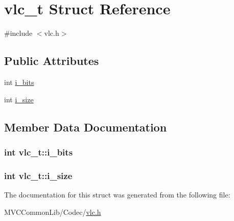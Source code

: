 \hypertarget{structvlc__t}{
\section{vlc\_\-t Struct Reference}
\label{structvlc__t}
}


{\ttfamily \#include $<$vlc.h$>$}

\subsection*{Public Attributes}
\begin{DoxyCompactItemize}
\item 
int \hyperlink{structvlc__t_af77d182a8c7102c14ec84be5b0f407c7}{i\_\-bits}
\item 
int \hyperlink{structvlc__t_a5f71a18991e1f971d2ffe3fd1272de77}{i\_\-size}
\end{DoxyCompactItemize}


\subsection{Member Data Documentation}
\hypertarget{structvlc__t_af77d182a8c7102c14ec84be5b0f407c7}{
\subsubsection[{i\_\-bits}]{\setlength{\rightskip}{0pt plus 5cm}int {\bf vlc\_\-t::i\_\-bits}}}
\label{structvlc__t_af77d182a8c7102c14ec84be5b0f407c7}
\hypertarget{structvlc__t_a5f71a18991e1f971d2ffe3fd1272de77}{
\subsubsection[{i\_\-size}]{\setlength{\rightskip}{0pt plus 5cm}int {\bf vlc\_\-t::i\_\-size}}}
\label{structvlc__t_a5f71a18991e1f971d2ffe3fd1272de77}


The documentation for this struct was generated from the following file:\begin{DoxyCompactItemize}
\item 
MVCCommonLib/Codec/\hyperlink{vlc_8h}{vlc.h}\end{DoxyCompactItemize}
